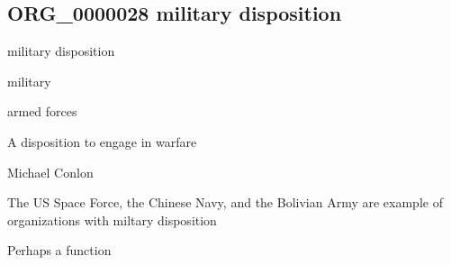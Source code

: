 \documentclass[letterpaper,10pt,english]{sphinxmanual}
\begin{document}
\subsection{ORG\_0000028 \sphinxhyphen{} military disposition}
\label{\detokenize{doc-ORG_0000028:org-0000028-military-disposition}}\label{\detokenize{doc-ORG_0000028:index-0}}\label{\detokenize{doc-ORG_0000028::doc}}
\begin{sphinxShadowBox}

\sphinxAtStartPar
military disposition
\end{sphinxShadowBox}

\begin{sphinxShadowBox}

\sphinxAtStartPar
military
\end{sphinxShadowBox}

\begin{sphinxShadowBox}

\sphinxAtStartPar
armed forces
\end{sphinxShadowBox}

\begin{sphinxShadowBox}

\sphinxAtStartPar
{\hyperref[\detokenize{doc-BFO_0000016::doc}]{}}
\end{sphinxShadowBox}

\begin{sphinxShadowBox}

\sphinxAtStartPar
A disposition to engage in warfare
\end{sphinxShadowBox}

\begin{sphinxShadowBox}

\sphinxAtStartPar
Michael Conlon 
\end{sphinxShadowBox}

\begin{sphinxShadowBox}

\sphinxAtStartPar
The US Space Force, the Chinese Navy, and the Bolivian Army are example of organizations with miltary disposition
\end{sphinxShadowBox}

\begin{sphinxShadowBox}

\sphinxAtStartPar
Perhaps a function
\end{sphinxShadowBox}
\end{document}
